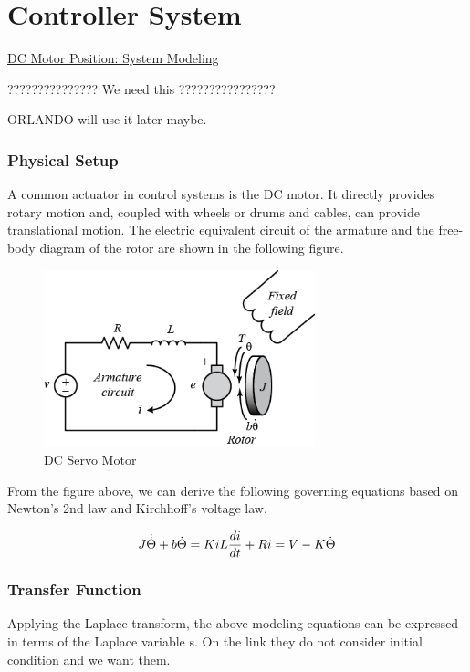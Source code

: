 \chapter{Controller System}\label{sec:controller_sys}
\href{http://ctms.engin.umich.edu/CTMS/index.php?example=MotorPosition&section=SystemModeling}{DC Motor Position: System Modeling}


??????????????? We need this ????????????????

ORLANDO will use it later maybe.

\subsection{Physical Setup}
A common actuator in control systems is the DC motor. It directly provides rotary motion and, coupled with wheels or drums and cables, can provide translational motion. The electric equivalent circuit of the armature and the free-body diagram of the rotor are shown in the following figure. 

\begin{figure}[h!]\label{fig:motor_model}
	\centering
	\includegraphics[width=0.7\textwidth]{figures/motor.png}
	\caption{DC Servo Motor}
\end{figure}

From the figure above, we can derive the following governing equations based on Newton's 2nd law and Kirchhoff's voltage law.

\begin{equation}
	J \dot{\dot{\Theta}} + b\dot{\Theta} = Ki \\
	L\frac{di}{dt} + Ri = V - K\dot{\Theta}
\end{equation}

\subsection{Transfer Function}
Applying the Laplace transform, the above modeling equations can be expressed in terms of the Laplace variable s. On the link they do not consider initial condition and we want them.


